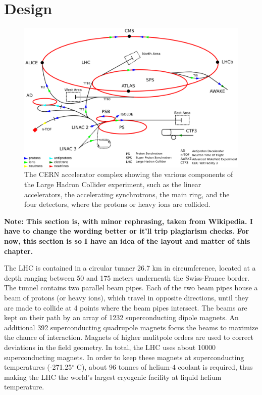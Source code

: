 \documentclass[11pt,a4paper,openright,twoside]{report}
\begin{document}
\section{Design}
\begin{figure}[H]
\centering
	\includegraphics[width=0.9\linewidth]{Cern_accelerator_complex.png}
	\caption{The CERN accelerator complex showing the various components of the Large Hadron Collider experiment, such as the linear accelerators, the accelerating synchrotrons, the main ring, and the four detectors, where the protons or heavy ions are collided.}
		\label{fig:LHCring}
\end{figure}
\textbf{Note: This section is, with minor rephrasing, taken from Wikipedia. I have to change the wording better or it'll trip plagiarism checks. For now, this section is so I have an idea of the layout and matter of this chapter.}

The LHC is contained in a circular tunner 26.7 km in circumference, located at a depth ranging between 50 and 175 meters underneath the Swiss-France border. The tunnel contains two parallel beam pipes. Each of the two beam pipes house a beam of protons (or heavy ions), which travel in opposite directions, until they are made to collide at 4 points where the beam pipes intersect. The beams are kept on their path by an array of 1232 superconducting dipole magnets. An additional 392 superconducting quadrupole magnets focus the beams to maximize the chance of interaction. Magnets of higher mulitpole orders are used to correct deviations in the field geometry. In total, the LHC uses about 10000 superconducting magnets. In order to keep these magnets at superconducting temperatures (-271.25$^\circ$ C), about 96 tonnes of helium-4 coolant is required, thus making the LHC the world's largest cryogenic facility at liquid helium temperature.
\end{document}
